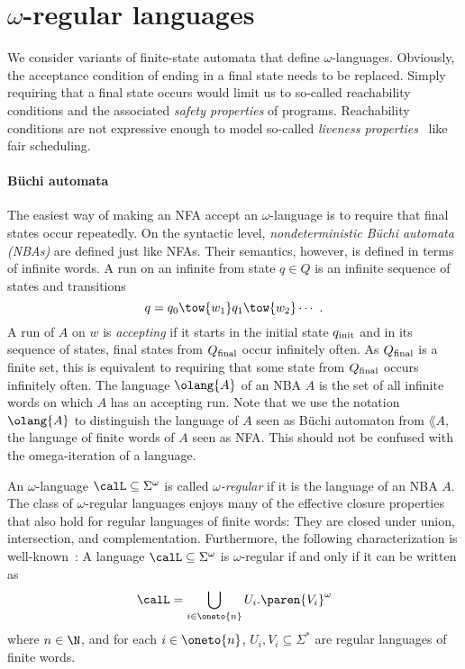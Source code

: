 \documentclass[../../diss.tex]{subfiles}
\begin{document}
\section{\texorpdfstring{$\omega$}{Omega}-regular languages}%
\label{LTS:OmegaAutomata}%

We consider variants of finite-state automata that define $\omega$-languages.
Obviously, the acceptance condition of ending in a final state needs to be replaced.
Simply requiring that a final state occurs would limit us to so-called reachability conditions and the associated \emph{safety properties} of programs.
Reachability conditions are not expressive enough to model so-called \emph{liveness properties}~\cite{GradelTW02} like fair scheduling.

\paragraph{Büchi automata}

The easiest way of making an NFA accept an $\omega$-language is to require that final states occur repeatedly.
On the syntactic level, \emph{nondeterministic Büchi automata (NBAs)} are defined just like NFAs.
Their semantics, however, is defined in terms of infinite words.
A run on an infinite  from state $q \in Q$ is an infinite sequence of states and transitions
\[
    q = q_0 \tow{w_1} q_1 \tow{w_2} \cdots
    \ .
\]
A run of $A$ on $w$ is \emph{accepting} if it starts in the initial state $q_{\text{init}}$ and in its sequence of states, final states from $Q_{\text{final}}$ occur infinitely often.
As $Q_{\text{final}}$ is a finite set, this is equivalent to requiring that some state from $Q_{\text{final}}$ occurs infinitely often.
The language $\olang{A}$ of an NBA $A$ is the set of all infinite words on which $A$ has an accepting run.
Note that we use the notation $\olang{A}$ to distinguish the language of $A$ seen as Büchi automaton from $\lang{A}$, the language of finite words of $A$ seen as NFA.\@
This should not be confused with the omega-iteration of a language.

An $\omega$-language $\calL \subseteq \Sigma^\omega$ is called \emph{$\omega$-regular} if it is the language of an NBA $A$.
The class of $\omega$-regular languages enjoys many of the effective closure properties that also hold for regular languages of finite words:
They are closed under union, intersection, and complementation.
Furthermore, the following characterization is well-known~\cite{Thomas90}:
A language $\calL \subseteq \Sigma^\omega$ is $\omega$-regular if and only if it can be written as
\[
    \calL = \bigcup_{i \in \oneto{n}} U_i.\paren{V_i}^\omega
\]
where $n \in \N$, and for each $i \in \oneto{n}$, $U_i,V_i \subseteq \Sigma^*$ are regular languages of finite words.
\end{document}
